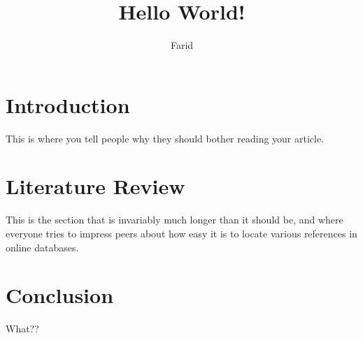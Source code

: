 \documentclass{article}
\title{Hello World!}
\author{Farid}
\begin{document}
\maketitle

\section{Introduction}
This is where you tell people why they should bother reading your article.

\section{Literature Review}
This is the section that is invariably much longer than it should be, and
where everyone tries to impress peers about how easy it is to locate various
references in online databases.

\section{Conclusion}
What??
\end{document}
